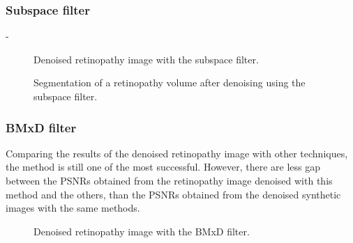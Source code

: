 \subsubsection{Subspace filter}
-
\begin{figure}[H]
  \centering
  \caption{Denoised retinopathy image with the subspace filter.} 
  \label{fig:results_rimage_subspace}
\end{figure}

\begin{figure}[H]
  \centering
  \caption{Segmentation of a retinopathy volume after denoising using the subspace filter.} 
  \label{fig:results_rsegmentation_subspace}
\end{figure}



\subsubsection{BMxD filter}
Comparing the results of the denoised retinopathy image with other techniques, the method is still one of the most successful. However, there are less gap between the PSNRs obtained from the retinopathy image denoised with this method and the others, than the PSNRs obtained from the denoised synthetic images with the same methods. 

\begin{figure}[H]
  \centering
  \caption{Denoised retinopathy image with the BMxD filter.} 
  \label{fig:results_rimage_bmxd}
\end{figure}

